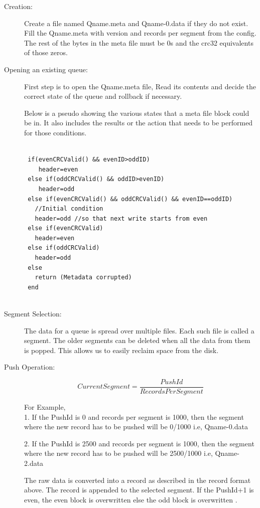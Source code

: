 \documentclass[12pt,a4paper]{article}
\begin{document}
\begin{description}
	\item [Creation:] 
	Create a file named Qname.meta and Qname-0.data if they do not exist.
	Fill the Qname.meta with version and records per segment from the config.
	The rest of the bytes in the meta file must be 0s and the crc32 equivalents of those zeros.
	
	\item [Opening an existing queue:]
	First step is to open the Qname.meta file, Read its contents and decide the correct state of the queue and rollback if necessary.
	
	Below is a pseudo showing the various states that a meta file block could be in. It also includes the results or the action that needs to be performed for those conditions.
	
	\begin{lstlisting}
	
 if(evenCRCValid() && evenID>oddID)
    header=even
 else if(oddCRCValid() && oddID>evenID)
    header=odd
 else if(evenCRCValid() && oddCRCValid() && evenID==oddID) 
   //Initial condition
   header=odd //so that next write starts from even
 else if(evenCRCValid)
   header=even
 else if(oddCRCValid)
   header=odd
 else
   return (Metadata corrupted)
 end
	
	\end{lstlisting}
	
	\item [Segment Selection:]
	The data for a queue is spread over multiple files. Each such file is called a segment. The older segments can be deleted when all the data from them is popped. This allows us to easily reclaim space from the disk. 
	
	\item [Push Operation:]
	\begin{equation}
	Current Segment =\frac{PushId}{RecordsPerSegment}
	\end{equation}
	
	
	For Example,\\
	1. If the PushId is 0 and records per segment is 1000, then the segment where the new record has to be pushed will be 0/1000 i.e, Qname-0.data
	
	2. If the PushId is 2500 and records per segment is 1000, then the segment where the new record has to be pushed will be 2500/1000 i.e, Qname-2.data
	
	The raw data is converted into a record as described in the record format above. The record is appended to the selected segment. If the PushId+1 is even, the even block is overwritten else the odd block is overwritten \citep{burnett1970study}.
	


\end{description}
\end{document}
